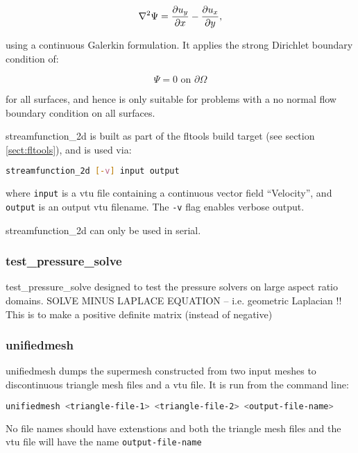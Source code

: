 \begin{equation}
\nabla^2 \Psi = \ppx{u_y} - \ppx[y]{u_x},
\end{equation}

using a continuous Galerkin formulation. It applies the strong Dirichlet
boundary condition of:

\begin{equation}
\Psi = 0 \text{ on } \partial \Omega
\end{equation}

for all surfaces, and hence is only suitable for problems with a no normal flow boundary
condition on all surfaces.

streamfunction\_2d is built as part of the fltools build target (see section \ref{sect:fltools}),
and is used via:

\begin{lstlisting}[language = Bash]
streamfunction_2d [-v] input output
\end{lstlisting}

where \lstinline[language = Bash]+input+ is a vtu file containing a continuous vector
field ``Velocity'', and \lstinline[language = Bash]+output+ is an output vtu filename. The
\lstinline[language = Bash]+-v+ flag enables verbose output.

streamfunction\_2d can only be used in serial.


\subsubsection{test\_pressure\_solve}
\label{sect:test_pressure_solve}
test\_pressure\_solve designed to test the pressure solvers on large aspect ratio domains. SOLVE MINUS LAPLACE EQUATION -- i.e. geometric Laplacian
  !! This is to make a positive definite matrix (instead of negative)


\subsubsection{unifiedmesh}
\label{sect:unifiedmesh}
unifiedmesh dumps the supermesh constructed from two input meshes to discontinuous triangle mesh files and a vtu file. It is run from the command line:
\begin{lstlisting}[language = Bash]
unifiedmesh <triangle-file-1> <triangle-file-2> <output-file-name>
\end{lstlisting} 
No file names should have extenstions and both the triangle mesh files and the vtu file will have the name \lstinline[language = Bash]+output-file-name+

